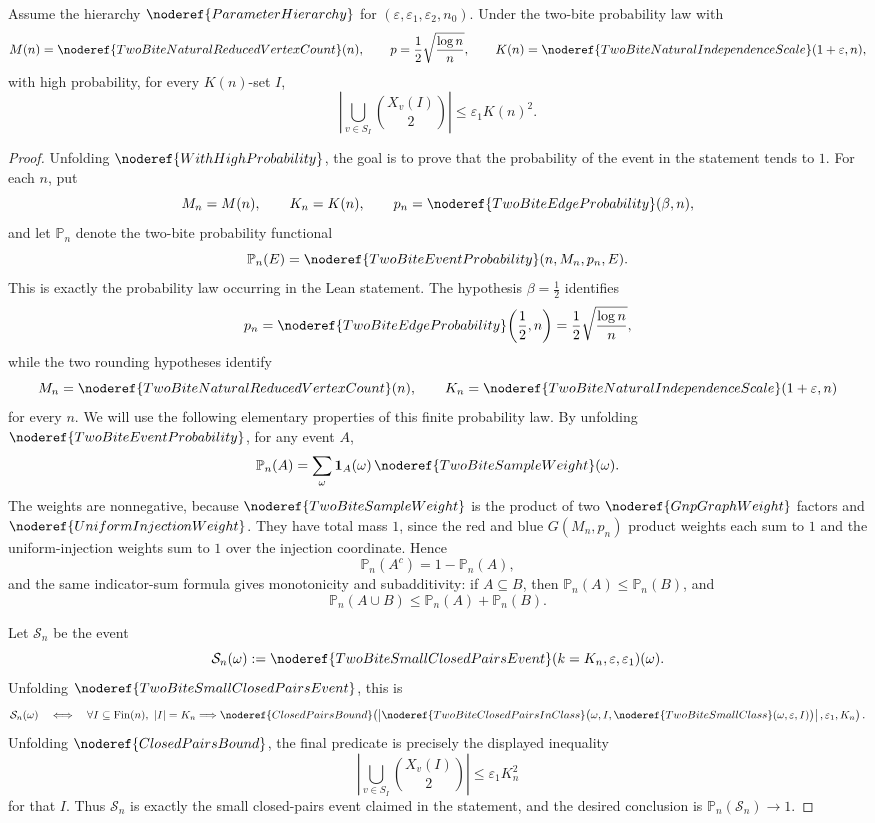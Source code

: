 \begin{lemma}
Assume the hierarchy \(\noderef{ParameterHierarchy}\) for
\((\varepsilon,\varepsilon_1,\varepsilon_2,n_0)\).  Under the two-bite
probability law with
\[
M(n)=\noderef{TwoBiteNaturalReducedVertexCount}(n),\qquad
p=\frac12\sqrt{\frac{\log n}{n}},
\qquad
K(n)=\noderef{TwoBiteNaturalIndependenceScale}(1+\varepsilon,n),
\]
with high probability, for every \(K(n)\)-set \(I\),
\[
\left|\bigcup_{v\in S_I}\binom{X_v(I)}2\right|\le \varepsilon_1 K(n)^2.
\]
\end{lemma}
\begin{proof}
Unfolding \(\noderef{WithHighProbability}\), the goal is to prove that the
probability of the event in the statement tends to \(1\).  For each \(n\), put
\[
M_n=M(n),\qquad K_n=K(n),\qquad
p_n=\noderef{TwoBiteEdgeProbability}(\beta,n),
\]
and let \(\mathbb P_n\) denote the two-bite probability functional
\[
\mathbb P_n(E)=
\noderef{TwoBiteEventProbability}(n,M_n,p_n,E).
\]
This is exactly the probability law occurring in the Lean statement.  The
hypothesis \(\beta=\frac12\) identifies
\[
p_n=\noderef{TwoBiteEdgeProbability}\!\left(\frac12,n\right)
     =\frac12\sqrt{\frac{\log n}{n}},
\]
while the two rounding hypotheses identify
\[
M_n=\noderef{TwoBiteNaturalReducedVertexCount}(n),\qquad
K_n=\noderef{TwoBiteNaturalIndependenceScale}(1+\varepsilon,n)
\]
for every \(n\).
We will use the following elementary properties of this finite probability
law.  By unfolding \(\noderef{TwoBiteEventProbability}\), for any event \(A\),
\[
\mathbb P_n(A)=
\sum_{\omega}
\mathbf 1_A(\omega)\,\noderef{TwoBiteSampleWeight}(\omega).
\]
The weights are nonnegative, because
\(\noderef{TwoBiteSampleWeight}\) is the product of two
\(\noderef{GnpGraphWeight}\) factors and
\(\noderef{UniformInjectionWeight}\).  They have total mass \(1\), since the
red and blue \(G(M_n,p_n)\) product weights each sum to \(1\) and the
uniform-injection weights sum to \(1\) over the injection coordinate.  Hence
\[
\mathbb P_n(A^c)=1-\mathbb P_n(A),
\]
and the same indicator-sum formula gives monotonicity and subadditivity: if
\(A\subseteq B\), then \(\mathbb P_n(A)\le\mathbb P_n(B)\), and
\[
\mathbb P_n(A\cup B)\le \mathbb P_n(A)+\mathbb P_n(B).
\]

Let \(\mathcal S_n\) be the event
\[
\mathcal S_n(\omega):=
\noderef{TwoBiteSmallClosedPairsEvent}(k=K_n,\varepsilon,\varepsilon_1)(\omega).
\]
Unfolding \(\noderef{TwoBiteSmallClosedPairsEvent}\), this is
\[
\mathcal S_n(\omega)\quad\Longleftrightarrow\quad
\forall I\subseteq \mathrm{Fin}(n),\ |I|=K_n\Longrightarrow
\noderef{ClosedPairsBound}\!\left(
\left|\noderef{TwoBiteClosedPairsInClass}
  \bigl(\omega,I,\noderef{TwoBiteSmallClass}(\omega,\varepsilon,I)\bigr)
\right|,
\varepsilon_1,K_n\right).
\]
Unfolding \(\noderef{ClosedPairsBound}\), the final predicate is precisely
the displayed inequality
\[
\left|\bigcup_{v\in S_I}\binom{X_v(I)}2\right|
\le \varepsilon_1 K_n^2
\]
for that \(I\).  Thus \(\mathcal S_n\) is exactly the small closed-pairs event
claimed in the statement, and the desired conclusion is
\(\mathbb P_n(\mathcal S_n)\to1\).


\end{proof}
